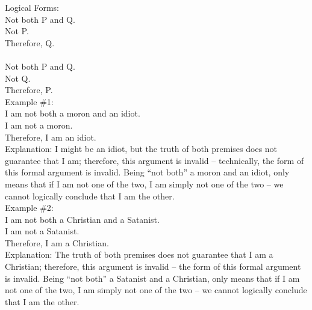 \documentclass[a4paper,12pt,single,pdftex]{scrbook}
\begin{document}
    
      Logical Forms:
    \\

    
      Not both P and Q.
    \\

    
      Not P.
    \\

    
      Therefore, Q.
    \\

    
       
    \\

    
      Not both P and Q.
    \\

    
      Not Q.
    \\

    
      Therefore, P.
    \\

    
      Example \#1:
    \\

    
      I am not both a moron and an idiot.
    \\

    
      I am not a moron.
    \\

    
      Therefore, I am an idiot.
    \\

    
      Explanation:  I might be an idiot, but the truth of both premises does not guarantee that I am; therefore, this argument is invalid -- technically, the form of this formal argument is invalid.  Being “not both” a moron and an idiot, only means that if I am not one of the two, I am simply not one of the two -- we cannot logically conclude that I am the other.
    \\

    
      Example \#2:
    \\

    
      I am not both a Christian and a Satanist.
    \\

    
      I am not a Satanist.
    \\

    
      Therefore, I am a Christian.
    \\

    
      Explanation:  The truth of both premises does not guarantee that I am a Christian; therefore, this argument is invalid -- the form of this formal argument is invalid.  Being “not both” a Satanist and a Christian, only means that if I am not one of the two, I am simply not one of the two -- we cannot logically conclude that I am the other.
    \\
\end{document}
